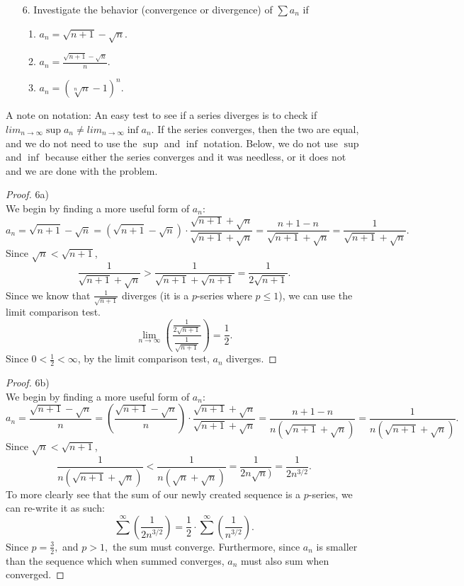 \documentclass[10pt]{article}
\theoremstyle{definition}
\theoremstyle{plain}
\begin{document}
\begin{enumerate}
\item[6.] Investigate the behavior (convergence or divergence) of $\sum a_n$ if
\begin{enumerate}
\item $a_n = \sqrt{n+1} - \sqrt{n}.$
\item $a_n = \frac{\sqrt{n+1} - \sqrt{n}}{n}.$
\item $a_n = (\sqrt[n]{n} - 1)^n.$
\end{enumerate}
\end{enumerate}
A note on notation: An easy test to see if a series diverges is to check if  $lim_{n\rightarrow\infty} \sup a_n \neq lim_{n\rightarrow\infty} \inf a_n$. If the series converges, then the two are equal, and we do not need to use the $\sup$ and $\inf$ notation. Below, we do not use $\sup$ and $\inf$ because either the series converges and it was needless, or it does not and we are done with the problem.
\begin{proof}
6a) \\

We begin by finding a more useful form of $a_n$:
$$a_n = \sqrt{n+1} - \sqrt{n} = (\sqrt{n+1} - \sqrt{n}) \cdot \frac{\sqrt{n+1} + \sqrt{n}}{\sqrt{n+1} + \sqrt{n}} = \frac{n+1-n}{\sqrt{n+1} + \sqrt{n}} = \frac{1}{\sqrt{n+1} + \sqrt{n}}.$$
Since $\sqrt{n} < \sqrt{n+1}$,
$$\frac{1}{\sqrt{n+1} + \sqrt{n}} > \frac{1}{\sqrt{n+1} + \sqrt{n+1}} = \frac{1}{2\sqrt{n+1}}.$$
Since we know that $\frac{1}{\sqrt{n+1}}$ diverges (it is a $p$-series where $p \leq 1$), we can use the limit comparison test.
$$\lim_{n\rightarrow\infty} \left(\frac{\frac{1}{2\sqrt{n+1}}}{\frac{1}{\sqrt{n+1}} }\right) = \frac{1}{2}.$$
Since $0<\frac{1}{2}<\infty$, by the limit comparison test, $a_n$ diverges.
\end{proof}

\begin{proof}
6b) \\

We begin by finding a more useful form of $a_n$:
$$a_n = \frac{\sqrt{n+1} - \sqrt{n}}{n} = (\frac{\sqrt{n+1} - \sqrt{n}}{n}) \cdot \frac{\sqrt{n+1} + \sqrt{n}}{\sqrt{n+1} + \sqrt{n}} = \frac{n+1-n}{n(\sqrt{n+1} + \sqrt{n})} = \frac{1}{n(\sqrt{n+1} + \sqrt{n})}.$$
Since $\sqrt{n}<\sqrt{n+1}$,
$$\frac{1}{n(\sqrt{n+1} + \sqrt{n})} < \frac{1}{n(\sqrt{n} + \sqrt{n})} = \frac{1}{2n\sqrt{n})} = \frac{1}{2n^{3/2}}.$$
To more clearly see that the sum of our newly created sequence is a $p$-series, we can re-write it as such:
$$\sum^{\infty} \left(\frac{1}{2n^{3/2}}\right) = \frac{1}{2} \cdot \sum^{\infty} \left(\frac{1}{n^{3/2}}\right).$$
Since $p = \frac{3}{2},$ and $p > 1,$ the sum must converge. Furthermore, since $a_n$ is smaller than the sequence which when summed converges, $a_n$ must also sum when converged.
\end{proof}
\end{document}
